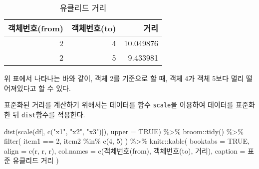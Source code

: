 \documentclass[
]{book}
\newenvironment{Shaded}{\begin{snugshade}}{\end{snugshade}}
\newcommand{\AttributeTok}[1]{\textcolor[rgb]{0.77,0.63,0.00}{#1}}
\newcommand{\ConstantTok}[1]{\textcolor[rgb]{0.00,0.00,0.00}{#1}}
\newcommand{\DecValTok}[1]{\textcolor[rgb]{0.00,0.00,0.81}{#1}}
\newcommand{\FunctionTok}[1]{\textcolor[rgb]{0.00,0.00,0.00}{#1}}
\newcommand{\NormalTok}[1]{#1}
\newcommand{\SpecialCharTok}[1]{\textcolor[rgb]{0.00,0.00,0.00}{#1}}
\newcommand{\StringTok}[1]{\textcolor[rgb]{0.31,0.60,0.02}{#1}}
\begin{document}
\begin{table}

\caption{\label{tab:euclidean-dist}유클리드 거리}
\centering
\begin{tabular}[t]{rrr}
\toprule
객체번호(from) & 객체번호(to) & 거리\\
\midrule
2 & 4 & 10.049876\\
2 & 5 & 9.433981\\
\bottomrule
\end{tabular}
\end{table}

위 표에서 나타나는 바와 같이, 객체 2를 기준으로 할 때, 객체 4가 객체 5보다 멀리 떨어져있다고 할 수 있다.

표준화된 거리를 계산하기 위해서는 데이터를 함수 \texttt{scale}을 이용하여 데이터를 표준화한 뒤 \texttt{dist}함수를 적용한다.

\begin{Shaded}
\begin{Highlighting}[]
\FunctionTok{dist}\NormalTok{(}\FunctionTok{scale}\NormalTok{(df[, }\FunctionTok{c}\NormalTok{(}\StringTok{"x1"}\NormalTok{, }\StringTok{"x2"}\NormalTok{, }\StringTok{"x3"}\NormalTok{)]), }\AttributeTok{upper =} \ConstantTok{TRUE}\NormalTok{) }\SpecialCharTok{\%\textgreater{}\%}
\NormalTok{  broom}\SpecialCharTok{::}\FunctionTok{tidy}\NormalTok{() }\SpecialCharTok{\%\textgreater{}\%}
  \FunctionTok{filter}\NormalTok{(}
\NormalTok{    item1 }\SpecialCharTok{==} \DecValTok{2}\NormalTok{,}
\NormalTok{    item2 }\SpecialCharTok{\%in\%} \FunctionTok{c}\NormalTok{(}\DecValTok{4}\NormalTok{, }\DecValTok{5}\NormalTok{)}
\NormalTok{  ) }\SpecialCharTok{\%\textgreater{}\%}
\NormalTok{  knitr}\SpecialCharTok{::}\FunctionTok{kable}\NormalTok{(}
    \AttributeTok{booktabs =} \ConstantTok{TRUE}\NormalTok{,}
    \AttributeTok{align =} \FunctionTok{c}\NormalTok{(}\StringTok{\textquotesingle{}r\textquotesingle{}}\NormalTok{, }\StringTok{\textquotesingle{}r\textquotesingle{}}\NormalTok{, }\StringTok{\textquotesingle{}r\textquotesingle{}}\NormalTok{),}
    \AttributeTok{col.names =} \FunctionTok{c}\NormalTok{(}\StringTok{\textquotesingle{}객체번호(from)\textquotesingle{}}\NormalTok{, }\StringTok{\textquotesingle{}객체번호(to)\textquotesingle{}}\NormalTok{, }\StringTok{\textquotesingle{}거리\textquotesingle{}}\NormalTok{),}
    \AttributeTok{caption =} \StringTok{\textquotesingle{}표준 유클리드 거리\textquotesingle{}}
\NormalTok{  )}
\end{Highlighting}
\end{Shaded}
\end{document}
